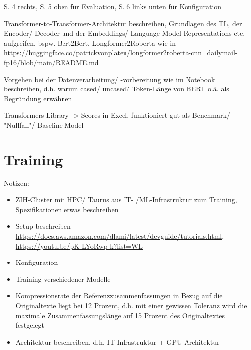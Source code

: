 \cite{YAN19} S. 4 rechts, S. 5 oben für Evaluation, S. 6 links unten für Konfiguration

Transformer-to-Transformer-Architektur beschreiben, Grundlagen des TL, der Encoder/ Decoder und der Embeddings/ Language Model Representations etc. aufgreifen, bspw. Bert2Bert, Longformer2Roberta wie in \url{https://huggingface.co/patrickvonplaten/longformer2roberta-cnn_dailymail-fp16/blob/main/README.md}

Vorgehen bei der Datenverarbeitung/ -vorbereitung wie im Notebook beschreiben, d.h. warum cased/ uncased? Token-Länge von BERT o.ä. als Begründung erwähnen

Transformers-Library -> Scores in Excel, funktioniert gut als Benchmark/ "Nullfall"/ Baseline-Model


\section{Training}
Notizen:
\begin{itemize}
	\item ZIH-Cluster mit HPC/ Taurus aus IT- /ML-Infrastruktur zum Training, Spezifikationen etwas beschreiben
	\item Setup beschreiben \url{https://docs.aws.amazon.com/dlami/latest/devguide/tutorials.html}, \url{https://youtu.be/pK-LYoRwp-k?list=WL}
	\item Konfiguration
	\item Training verschiedener Modelle
	\item Kompressionsrate der Referenzzusammenfassungen in Bezug auf die Originaltexte liegt bei 12 Prozent, d.h. mit einer gewissen Toleranz wird die maximale Zusammenfassungslänge auf 15 Prozent des Originaltextes festgelegt
	\item Architektur beschreiben, d.h. IT-Infrastruktur + GPU-Architektur
\end{itemize}


